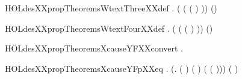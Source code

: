 \begin{SaveVerbatim}{HOLdesXXpropTheoremsWtextThreeXXdef}
\HOLTokenTurnstile{}  \HOLSymConst{=}
   \HOLTokenLeftbrace{} \HOLTokenBar{} \HOLSymConst{\HOLTokenExists{}}.  ( (  (  ) )) \HOLSymConst{=} (\HOLSymConst{,})\HOLTokenRightbrace{}
\end{SaveVerbatim}
\newcommand{\HOLdesXXpropTheoremsWtextThreeXXdef}{\UseVerbatim{HOLdesXXpropTheoremsWtextThreeXXdef}}
\begin{SaveVerbatim}{HOLdesXXpropTheoremsWtextFourXXdef}
\HOLTokenTurnstile{}  \HOLSymConst{=}
   \HOLTokenLeftbrace{} \HOLTokenBar{} \HOLSymConst{\HOLTokenExists{}}.  ( (  (  ) )) \HOLSymConst{=} (\HOLSymConst{,})\HOLTokenRightbrace{}
\end{SaveVerbatim}
\newcommand{\HOLdesXXpropTheoremsWtextFourXXdef}{\UseVerbatim{HOLdesXXpropTheoremsWtextFourXXdef}}
\begin{SaveVerbatim}{HOLdesXXpropTheoremsXcauseYFXXconvert}
\HOLTokenTurnstile{} \HOLSymConst{\HOLTokenForall{}}  .     \HOLSymConst{=}   
\end{SaveVerbatim}
\newcommand{\HOLdesXXpropTheoremsXcauseYFXXconvert}{\UseVerbatim{HOLdesXXpropTheoremsXcauseYFXXconvert}}
\begin{SaveVerbatim}{HOLdesXXpropTheoremsXcauseYFpXXeq}
\HOLTokenTurnstile{} \HOLSymConst{\HOLTokenForall{}} .
      \HOLSymConst{=}   \HOLSymConst{\HOLTokenConj{}}  \HOLSymConst{=}   \HOLSymConst{\HOLTokenConj{}}  \HOLSymConst{=}   \HOLSymConst{\HOLTokenImp{}}
        \HOLSymConst{=}
     \HOLConst{\HOLTokenPI{}} (\HOLTokenLambda{}.  (  ) (  ) ( (  )))
       ( )
\end{SaveVerbatim}
